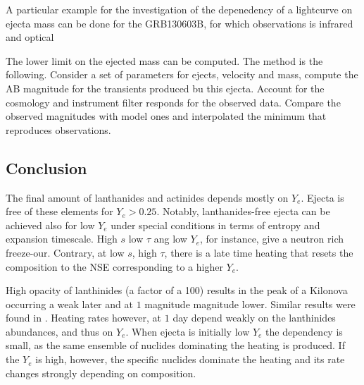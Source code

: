 A particular example for the investigation of the depenedency of a lightcurve on ejecta mass can be done for the GRB130603B, for which observations is infrared and optical \citep{Berger:2013wna,Tanvir:2013pia}

The lower limit on the ejected mass can be computed. The method is the following. Consider a set of parameters for ejects, velocity and mass, compute the AB magnitude for the transients produced bu this ejecta. Account for the cosmology and instrument filter responds for the observed data. Compare the observed magnitudes with model ones and interpolated the minimum that reproduces observations.


\subsection{Conclusion}


The final amount of lanthanides and actinides depends mostly on $Y_e$. Ejecta is free of these elements for $Y_e > 0.25$. Notably, lanthanides-free ejecta can be achieved also for low $Y_e$ under special conditions in terms of entropy and expansion timescale. High $s$ low $\tau$ ang low $Y_e$, for instance, give a neutron rich freeze-our. Contrary, at low $s$, high $\tau$, there is a late time heating that resets the composition to the \ac{NSE} corresponding to a higher $Y_e$. 

High opacity of lanthinides (a factor of a 100) results in the peak of a Kilonova occurring a weak later and at $1$ magnitude magnitude lower. Similar results were found in \citet{Roberts:2011;Kasen:2013xka,Tanaka:2013ana,Grossman:2013lqa}. Heating rates however, at $1$ day depend weakly on the lanthinides abundances, and thus on $Y_e$. When ejecta is initially low $Y_e$ the dependency is small, as the same ensemble of nuclides dominating the heating is produced. If the $Y_e$ is high, however, the specific nuclides dominate the heating and its rate changes strongly depending on composition. 
